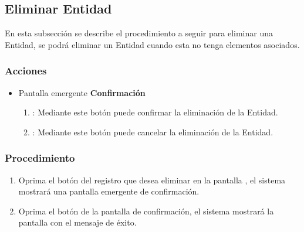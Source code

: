 \subsection{Eliminar Entidad}

En esta subsección se describe el procedimiento a seguir para eliminar una Entidad, se podrá eliminar un Entidad cuando esta no tenga elementos asociados.

\subsubsection{Acciones}
\begin{itemize}
  \item Pantalla emergente \textbf{Confirmación}
  \begin{enumerate}
	\item {}: Mediante este botón puede confirmar la eliminación de la Entidad.
	\item {}: Mediante este botón puede cancelar la eliminación de la Entidad.
  \end{enumerate}
\end{itemize}

\subsubsection{Procedimiento}
\begin{enumerate}
	\item Oprima el botón \btnEliminar del registro que desea eliminar en la pantalla , el sistema mostrará una pantalla emergente de confirmación.
	
	\item Oprima el botón  de la pantalla de confirmación, el sistema mostrará la pantalla  con el mensaje de éxito.
\end{enumerate}

